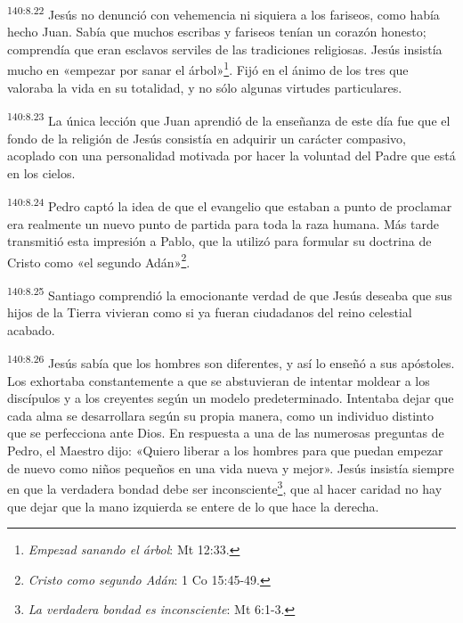 \par
\textsuperscript{140:8.22} Jesús no denunció con vehemencia ni siquiera a los fariseos, como había hecho Juan. Sabía que muchos escribas y fariseos tenían un corazón honesto; comprendía que eran esclavos serviles de las tradiciones religiosas. Jesús insistía mucho en «empezar por sanar el árbol»\footnote{\textit{Empezad sanando el árbol}: Mt 12:33.}. Fijó en el ánimo de los tres que valoraba la vida en su totalidad, y no sólo algunas virtudes particulares.

\par
\textsuperscript{140:8.23} La única lección que Juan aprendió de la enseñanza de este día fue que el fondo de la religión de Jesús consistía en adquirir un carácter compasivo, acoplado con una personalidad motivada por hacer la voluntad del Padre que está en los cielos.

\par
\textsuperscript{140:8.24} Pedro captó la idea de que el evangelio que estaban a punto de proclamar era realmente un nuevo punto de partida para toda la raza humana. Más tarde transmitió esta impresión a Pablo, que la utilizó para formular su doctrina de Cristo como «el segundo Adán»\footnote{\textit{Cristo como segundo Adán}: 1 Co 15:45-49.}.

\par
\textsuperscript{140:8.25} Santiago comprendió la emocionante verdad de que Jesús deseaba que sus hijos de la Tierra vivieran como si ya fueran ciudadanos del reino celestial acabado.

\par
\textsuperscript{140:8.26} Jesús sabía que los hombres son diferentes, y así lo enseñó a sus apóstoles. Los exhortaba constantemente a que se abstuvieran de intentar moldear a los discípulos y a los creyentes según un modelo predeterminado. Intentaba dejar que cada alma se desarrollara según su propia manera, como un individuo distinto que se perfecciona ante Dios. En respuesta a una de las numerosas preguntas de Pedro, el Maestro dijo: «Quiero liberar a los hombres para que puedan empezar de nuevo como niños pequeños en una vida nueva y mejor». Jesús insistía siempre en que la verdadera bondad debe ser inconsciente\footnote{\textit{La verdadera bondad es inconsciente}: Mt 6:1-3.}, que al hacer caridad no hay que dejar que la mano izquierda se entere de lo que hace la derecha.

